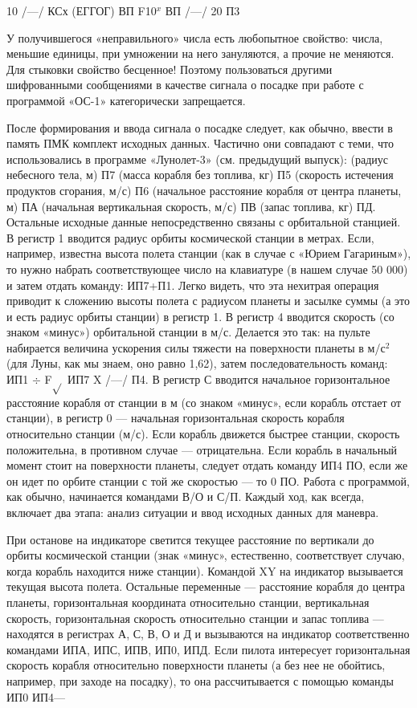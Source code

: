 \documentclass[11pt,a4paper,oneside]{article}
\begin{document}
10 /—/ КСх (ЕГГОГ) ВП F10$^{x}$ ВП /—/ 20 П3

У получившегося «неправильного» числа есть любопытное свойство: числа, меньшие единицы, при умножении на него зануляются, а прочие не меняются. Для стыковки свойство бесценное! Поэтому пользоваться другими шифрованными сообщениями в качестве сигнала о посадке при работе с программой «ОС-1» категорически запрещается.

После формирования и ввода сигнала о посадке следует, как обычно, ввести в память ПМК комплект исходных данных. Частично они совпадают с теми, что использовались в программе «Лунолет-3» (см. предыдущий выпуск): (радиус небесного тела, м) П7 (масса корабля без топлива, кг) П5 (скорость истечения продуктов сгорания, м/с) П6 (начальное расстояние корабля от центра планеты, м) ПА (начальная вертикальная скорость, м/с) ПВ (запас топлива, кг) ПД. Остальные исходные данные непосредственно связаны с орбитальной станцией. В регистр 1 вводится радиус орбиты космической станции в метрах. Если, например, известна высота полета станции (как в случае с «Юрием Гагариным»), то нужно набрать соответствующее число на клавиатуре (в нашем случае 50 000) и затем отдать команду: ИП7+П1. Легко видеть, что эта нехитрая операция приводит к сложению высоты полета с радиусом планеты и засылке суммы (а это и есть радиус орбиты станции) в регистр 1. В регистр 4 вводится скорость (со знаком «минус») орбитальной станции в м/с. Делается это так: на пульте набирается величина ускорения силы тяжести на поверхности планеты в м/с$^{2}$ (для Луны, как мы знаем, оно равно 1,62), затем последовательность команд: ИП1 $\div$ F$\sqrt{}$ ИП7 X /—/ П4. В регистр С вводится начальное горизонтальное расстояние корабля от станции в м (со знаком «минус», если корабль отстает от станции), в регистр 0 — начальная горизонтальная скорость корабля относительно станции (м/с). Если корабль движется быстрее станции, скорость положительна, в противном случае — отрицательна. Если корабль в начальный момент стоит на поверхности планеты, следует отдать команду ИП4 ПО, если же он идет по орбите станции с той же скоростью — то 0 ПО. Работа с программой, как обычно, начинается командами В/О и С/П. Каждый ход, как всегда, включает два этапа: анализ ситуации и ввод исходных данных для маневра.

При останове на индикаторе светится текущее расстояние по вертикали до орбиты космической станции (знак «минус», естественно, соответствует случаю, когда корабль находится ниже станции). Командой XY на индикатор вызывается текущая высота полета. Остальные переменные — расстояние корабля до центра планеты, горизонтальная координата относительно станции, вертикальная скорость, горизонтальная скорость относительно станции и запас топлива — находятся в регистрах А, С, В, О и Д и вызываются на индикатор соответственно командами ИПА, ИПС, ИПВ, ИП0, ИПД. Если пилота интересует горизонтальная скорость корабля относительно поверхности планеты (а без нее не обойтись, например, при заходе на посадку), то она рассчитывается с помощью команды ИП0 ИП4—
\end{document}
